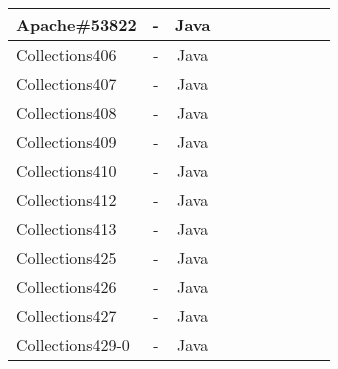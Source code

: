 \begin{table}[h!]
\begin{tabular}{lccccccccc}
    Apache\#53822     &  -  & Java  &  &              &    &                                 &                   &                           &                                \\
    \midrule
    Collections406    &  -  & Java  &  &              &    &                                 &                   &                           &                               \\
    Collections407    &  -  & Java  &  &              &    &                                 &                   &                           &                              \\
    Collections408    &  -  & Java  &  &              &    &                                 &                   &                           &                                \\
    Collections409    &  -  & Java  &  &              &    &                                 &                   &                           &                                \\
    Collections410    &  - & Java  &  &              &    &                                 &                   &                           &                                \\
    Collections412    &  -  & Java  &  &              &    &                                 &                   &                           &                                \\
    Collections413    &  -  & Java  &  &              &    &                                 &                   &                           &                                \\
    Collections425    &  -  & Java  &  &              &    &                                 &                   &                           &                                \\
    Collections426    &  -  & Java  &  &              &    &                                 &                   &                           &                                \\
    Collections427    &   - & Java  &  &              &    &                                 &                   &                           &                                \\
    Collections429-0    &  -  & Java  &  &              &    &                                 &                   &                           &                                \\

\end{tabular}
\end{table}
